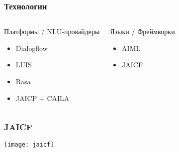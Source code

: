 \begin{frame}
    \frametitle{Технологии}

    \begin{columns}
        \begin{block}{Платформы / NLU-провайдеры}
            \begin{itemize}
                \item Dialogflow
                \item LUIS
                \item Rasa
                \item JAICP + CAILA
            \end{itemize}
        \end{block}

        \begin{block}{Языки / Фреймворки}
            \begin{itemize}
                \item AIML
                \item JAICF
            \end{itemize}
        \end{block}
    \end{columns}
\end{frame}

\begin{frame}
    \frametitle{JAICF}
    \centering
    \texttt{[image: jaicf]}
\end{frame}

